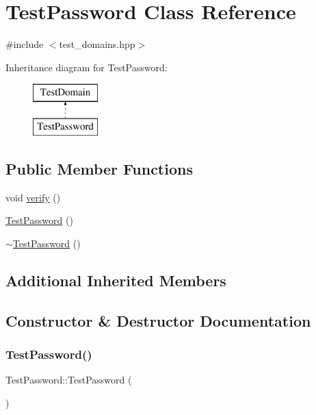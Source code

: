 \hypertarget{class_test_password}{}\section{Test\+Password Class Reference}
\label{class_test_password}


{\ttfamily \#include $<$test\+\_\+domains.\+hpp$>$}

Inheritance diagram for Test\+Password\+:\begin{figure}[H]
\begin{center}
\leavevmode
\includegraphics[height=2.000000cm]{class_test_password}
\end{center}
\end{figure}
\subsection*{Public Member Functions}
\begin{DoxyCompactItemize}
\item 
void \hyperlink{class_test_password_ac1b1f3a83e7e6b76b635a0e09004c7b6}{verify} ()
\item 
\hyperlink{class_test_password_ac69097f5ca9cf4b1684268614b7dacd2}{Test\+Password} ()
\item 
\hyperlink{class_test_password_a944afaaae5f53c83d3060f93c2f4f474}{$\sim$\+Test\+Password} ()
\end{DoxyCompactItemize}
\subsection*{Additional Inherited Members}


\subsection{Constructor \& Destructor Documentation}
\mbox{\label{class_test_password_ac69097f5ca9cf4b1684268614b7dacd2}} 
\subsubsection{\texorpdfstring{Test\+Password()}{TestPassword()}}
{\footnotesize\ttfamily Test\+Password\+::\+Test\+Password (\begin{DoxyParamCaption}{ }\end{DoxyParamCaption})}

